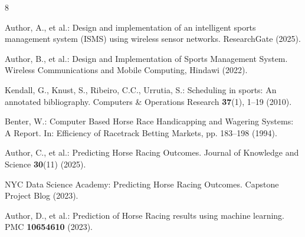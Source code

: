 \documentclass{llncs}
\begin{document}
\begin{thebibliography}{8}

Author, A., et al.: Design and implementation of an intelligent sports management system (ISMS) using wireless sensor networks. ResearchGate (2025).

Author, B., et al.: Design and Implementation of Sports Management System. Wireless Communications and Mobile Computing, Hindawi (2022). 

Kendall, G., Knust, S., Ribeiro, C.C., Urrutia, S.: Scheduling in sports: An annotated bibliography. Computers \& Operations Research \textbf{37}(1), 1--19 (2010).

Benter, W.: Computer Based Horse Race Handicapping and Wagering Systems: A Report. In: Efficiency of Racetrack Betting Markets, pp. 183--198 (1994).

Author, C., et al.: Predicting Horse Racing Outcomes. Journal of Knowledge and Science \textbf{30}(11) (2025). 

NYC Data Science Academy: Predicting Horse Racing Outcomes. Capstone Project Blog (2023).

Author, D., et al.: Prediction of Horse Racing results using machine learning. PMC \textbf{10654610} (2023).

\end{thebibliography}
\end{document}
